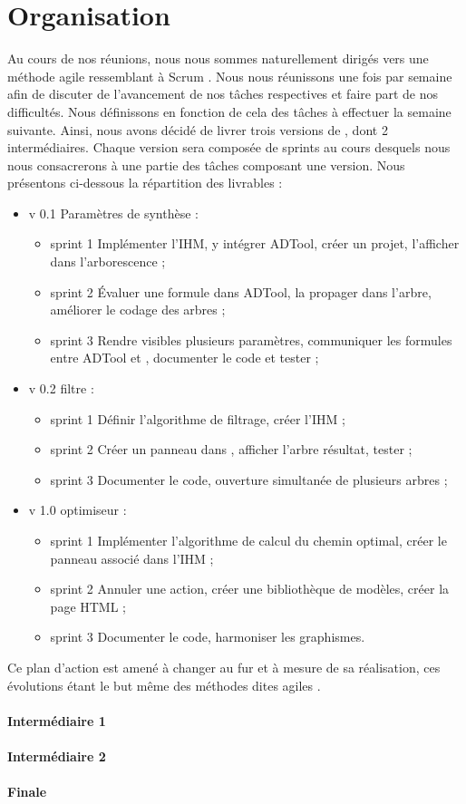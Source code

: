 \section{Organisation}
	\label{sec:livrables}

	Au cours de nos réunions, nous nous sommes naturellement dirigés vers une méthode agile ressemblant à \og Scrum \fg. Nous nous réunissons une fois par semaine afin de discuter de l'avancement de nos tâches respectives et faire part de nos difficultés. Nous définissons en fonction de cela des tâches à effectuer la semaine suivante. Ainsi, nous avons décidé de livrer trois versions de \glasir{}, dont 2 intermédiaires.
	Chaque version sera composée de sprints au cours desquels nous nous consacrerons à une partie des tâches composant une version.
	Nous présentons ci-dessous la répartition des livrables :
	
	\begin{itemize}
		\item{v 0.1} Paramètres de synthèse :
		\begin{itemize}
			\item{sprint 1} Implémenter l'IHM, y intégrer ADTool, créer un projet, l'afficher dans l'arborescence ;
			\item{sprint 2} Évaluer une formule dans ADTool, la propager dans l'arbre, améliorer le codage des arbres ;
			\item{sprint 3} Rendre visibles plusieurs paramètres, communiquer les formules entre ADTool et \glasir{}, documenter le code et tester ;
		\end{itemize}
		\item{v 0.2} filtre :
		\begin{itemize}
			\item{sprint 1} Définir l'algorithme de filtrage, créer l'IHM ;
			\item{sprint 2} Créer un panneau dans \glasir{}, afficher l'arbre résultat, tester ;
			\item{sprint 3} Documenter le code, ouverture simultanée de plusieurs arbres ;
		\end{itemize}
		\item{v 1.0} optimiseur :
		\begin{itemize}
			\item{sprint 1} Implémenter l'algorithme de calcul du chemin optimal, créer le panneau associé dans l'IHM ;
			\item{sprint 2} Annuler une action, créer une bibliothèque de modèles, créer la page HTML ;
			\item{sprint 3} Documenter le code, harmoniser les graphismes.
		\end{itemize}
	\end{itemize}

	Ce plan d'action est amené à changer au fur et à mesure de sa réalisation, ces évolutions étant le but même des méthodes dites \og agiles \fg.
	\paragraph{Intermédiaire 1}

	\paragraph{Intermédiaire 2}

	\paragraph{Finale}